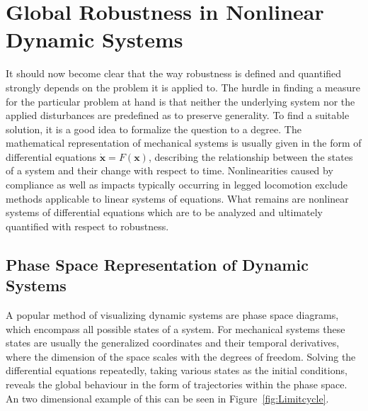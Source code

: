 \section{Global Robustness in Nonlinear Dynamic Systems} \label{Global Robustness}
It should now become clear that the way robustness is defined and quantified strongly depends on the problem it is applied to. The hurdle in finding a measure for the particular problem at hand is that neither the underlying system nor the applied disturbances are predefined as to preserve generality. 
To find a suitable solution, it is a good idea to formalize the question to a degree. The mathematical representation of mechanical systems is usually given in the form of differential equations $\dot{\textbf{x}} =F(\textbf{x})$, describing the relationship between the states of a system and their change with respect to time. 
Nonlinearities caused by compliance as well as impacts typically occurring in legged locomotion exclude methods applicable to linear systems of equations. 
What remains are nonlinear systems of differential equations which are to be analyzed and ultimately quantified with respect to robustness. 
 
\subsection{Phase Space Representation of Dynamic Systems} \label{Phase Space}
A popular method of visualizing dynamic systems are phase space diagrams, which encompass all possible states of a system. For mechanical systems these states are usually the generalized coordinates and their temporal derivatives, where the dimension of the space scales with the degrees of freedom. Solving the differential equations repeatedly, taking various states as the initial conditions, reveals the global behaviour in the form of trajectories within the phase space. An two dimensional example of this can be seen in Figure~\ref{fig:Limitcycle}.

